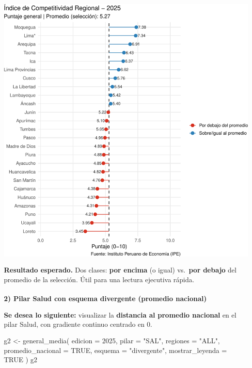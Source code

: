 \documentclass[
  11pt,
  letterpaper,
  DIV=11,
  numbers=noendperiod]{scrartcl}
\makeatletter
\let\oldparagraph\paragraph
\renewcommand{\paragraph}{
    \@ifstar
      \xxxParagraphStar
      \xxxParagraphNoStar
  }
\newcommand{\xxxParagraphStar}[1]{\oldparagraph*{#1}\mbox{}}
\newcommand{\xxxParagraphNoStar}[1]{\oldparagraph{#1}\mbox{}}
\newenvironment{Shaded}{\begin{snugshade}}{\end{snugshade}}
\newcommand{\AttributeTok}[1]{\textcolor[rgb]{0.40,0.45,0.13}{#1}}
\newcommand{\ConstantTok}[1]{\textcolor[rgb]{0.56,0.35,0.01}{#1}}
\newcommand{\DecValTok}[1]{\textcolor[rgb]{0.68,0.00,0.00}{#1}}
\newcommand{\FunctionTok}[1]{\textcolor[rgb]{0.28,0.35,0.67}{#1}}
\newcommand{\NormalTok}[1]{\textcolor[rgb]{0.00,0.23,0.31}{#1}}
\newcommand{\OtherTok}[1]{\textcolor[rgb]{0.00,0.23,0.31}{#1}}
\newcommand{\StringTok}[1]{\textcolor[rgb]{0.13,0.47,0.30}{#1}}
\makeatother
\begin{document}
\includegraphics{Manual_files/figure-pdf/unnamed-chunk-47-1.pdf}

\textbf{Resultado esperado.} Dos clases: \textbf{por encima} (o igual)
vs.~\textbf{por debajo} del promedio de la selección. Útil para una
lectura ejecutiva rápida.

\paragraph{\texorpdfstring{\textbf{2) Pilar Salud con esquema divergente
(promedio
nacional)}}{2) Pilar Salud con esquema divergente (promedio nacional)}}\label{pilar-salud-con-esquema-divergente-promedio-nacional}

\textbf{Se desea lo siguiente:} visualizar la \textbf{distancia al
promedio nacional} en el pilar Salud, con gradiente continuo centrado en
0.

\begin{Shaded}
\begin{Highlighting}[]
\NormalTok{g2 }\OtherTok{\textless{}{-}} \FunctionTok{general\_media}\NormalTok{(}
  \AttributeTok{edicion =} \DecValTok{2025}\NormalTok{,}
  \AttributeTok{pilar   =} \StringTok{"SAL"}\NormalTok{,         }
  \AttributeTok{regiones =} \StringTok{"ALL"}\NormalTok{,}
  \AttributeTok{promedio\_nacional =} \ConstantTok{TRUE}\NormalTok{,}
  \AttributeTok{esquema =} \StringTok{"divergente"}\NormalTok{,}
  \AttributeTok{mostrar\_leyenda =} \ConstantTok{TRUE}
\NormalTok{)}
\NormalTok{g2}
\end{Highlighting}
\end{Shaded}
\end{document}
